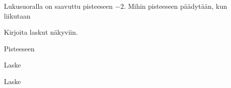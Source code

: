 \begin{tehtavasivu}
\begin{tehtava}
   	Lukusuoralla on saavuttu pisteeseen $-2$. Mihin pisteeseen päädytään, kun liikutaan
    \begin{alakohdat}
    \end{alakohdat}
Kirjoita laskut näkyviin.
    \begin{vastaus}
    	Pisteeseen 
        \begin{alakohdat}
        \end{alakohdat}
    \end{vastaus}
\end{tehtava}

\begin{tehtava}
Laske

    \begin{alakohdat}
    \end{alakohdat}
\begin{vastaus}
    \begin{alakohdat}
    \end{alakohdat}
\end{vastaus}
\end{tehtava}

\begin{tehtava}
Laske

    \begin{alakohdat}
    \end{alakohdat}
\begin{vastaus}
    \begin{alakohdat}
    \end{alakohdat}
\end{vastaus}
\end{tehtava}


\end{tehtavasivu}
